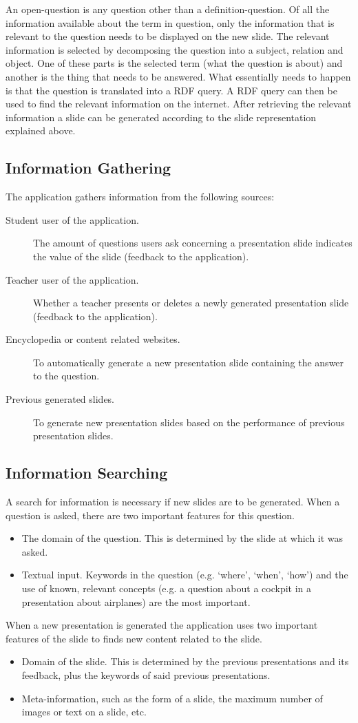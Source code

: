 \documentclass[11pt]{article}
\begin{document}
An open-question is any question other than a definition-question. Of all the information available about the term in question, only the information that is relevant to the question needs to be displayed on the new slide. The relevant information is selected by decomposing the question into a subject, relation and object. One of these parts is the selected term (what the question is about) and another is the thing that needs to be answered. What essentially needs to happen is that the question is translated into a RDF query. A RDF query can then be used to find the relevant information on the internet. After retrieving the relevant information a slide can be generated according to the slide representation explained above.

\subsection{Information Gathering}
The application gathers information from the following sources:
\begin{description}
\item[Student user of the application.] The amount of questions users ask concerning a presentation slide indicates the value of the slide (feedback to the application).
\item[Teacher user of the application.] Whether a teacher presents or deletes a newly generated presentation slide (feedback to the application).
\item[Encyclopedia or content related websites.] To automatically generate a new presentation slide containing the answer to the question.
\item[Previous generated slides.] To generate new presentation slides based on the performance of previous presentation slides.
\end{description}

\subsection{Information Searching}
A search for information is necessary if new slides are to be generated. When a question is asked, there are two important features for this question.
\begin{itemize}
\item The domain of the question. This is determined by the slide at which it was asked. 
\item Textual input. Keywords in the question (e.g. `where', `when', `how') and the use of known, relevant concepts (e.g. a question about a cockpit in a presentation about airplanes) are the most important.
\end{itemize}
When a new presentation is generated the application uses two important features of the slide to finds new content related to the slide.
\begin{itemize}
\item Domain of the slide. This is determined by the previous presentations and its feedback, plus the keywords of said previous presentations.
\item Meta-information, such as the form of a slide, the maximum number of images or text on a slide, etc.
\end{itemize}
\end{document}
